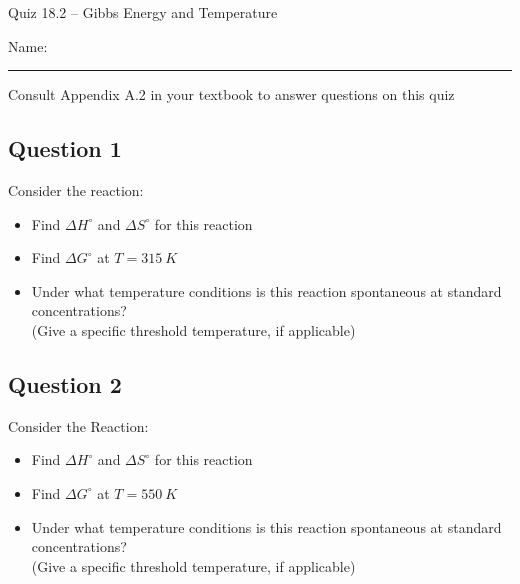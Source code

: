 \documentclass[11pt, letterpaper]{memoir}
\begin{document}
	\begin{center}
		{\large	Quiz 18.2 -- Gibbs Energy and Temperature}
	\end{center}
	{\large Name: \rule[-1mm]{4in}{.1pt} 

\noindent Consult Appendix A.2 in your textbook to answer questions on this quiz

\subsection*{Question 1}
Consider the reaction: 

\noindent
\begin{itemize}
	\item Find $\Delta H^{\circ}$ and $\Delta S^{\circ}$ for this reaction
	
	\vspace{4em}
	\item Find $\Delta G^{\circ}$ at $T=315~K$
	
	\vspace{4em}	
	\item Under what temperature conditions is this reaction spontaneous at standard concentrations? \\(Give a specific threshold temperature, if applicable)
\end{itemize}

\vspace{4em}
\subsection*{Question 2}
Consider the Reaction: 

\noindent
\begin{itemize}
	\item Find $\Delta H^{\circ}$ and $\Delta S^{\circ}$ for this reaction
	
	\vspace{4em}
	\item Find $\Delta G^{\circ}$ at $T=550~K$
	
	\vspace{4em}
	\item Under what temperature conditions is this reaction spontaneous at standard concentrations? \\(Give a specific threshold temperature, if applicable)
\end{itemize}

	\newpage
	\pagestyle{empty}
	\addtocounter{page}{-1}
}
\end{document}
